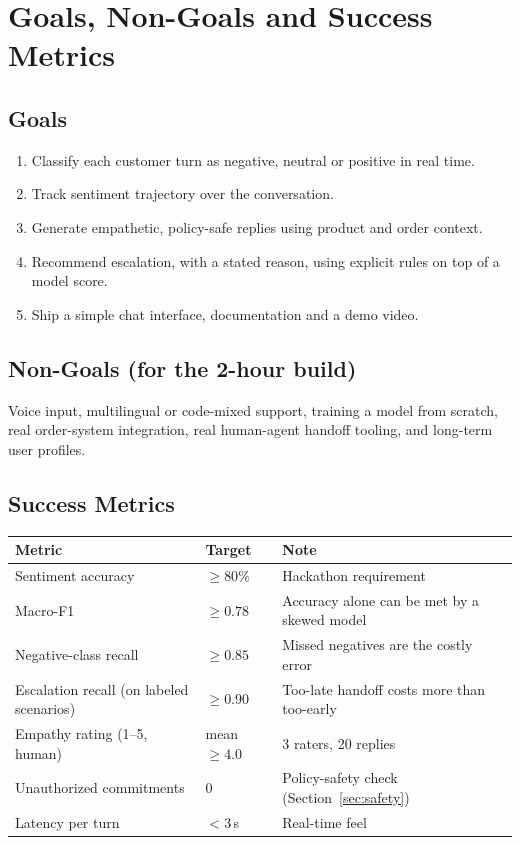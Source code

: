 \documentclass[11pt,a4paper]{article}
\begin{document}
\section{Goals, Non-Goals and Success Metrics}
\subsection{Goals}
\begin{enumerate}
\item Classify each customer turn as negative, neutral or positive in real time.
\item Track sentiment trajectory over the conversation.
\item Generate empathetic, policy-safe replies using product and order context.
\item Recommend escalation, with a stated reason, using explicit rules on top of a model score.
\item Ship a simple chat interface, documentation and a demo video.
\end{enumerate}

\subsection{Non-Goals (for the 2-hour build)}
Voice input, multilingual or code-mixed support, training a model from scratch, real order-system integration, real human-agent handoff tooling, and long-term user profiles.

\subsection{Success Metrics}
\begin{center}
\begin{tabular}{@{}p{4.2cm}p{4.6cm}p{5.6cm}@{}}
\toprule
\textbf{Metric} & \textbf{Target} & \textbf{Note}\\
\midrule
Sentiment accuracy & $\ge 80\%$ & Hackathon requirement\\
Macro-F1 & $\ge 0.78$ & Accuracy alone can be met by a skewed model \cite{pereira2022}\\
Negative-class recall & $\ge 0.85$ & Missed negatives are the costly error\\
Escalation recall (on labeled scenarios) & $\ge 0.90$ & Too-late handoff costs more than too-early\\
Empathy rating (1--5, human) & mean $\ge 4.0$ & 3 raters, 20 replies\\
Unauthorized commitments & 0 & Policy-safety check (Section~\ref{sec:safety})\\
Latency per turn & $< 3$\,s & Real-time feel\\
\bottomrule
\end{tabular}
\end{center}
\end{document}
